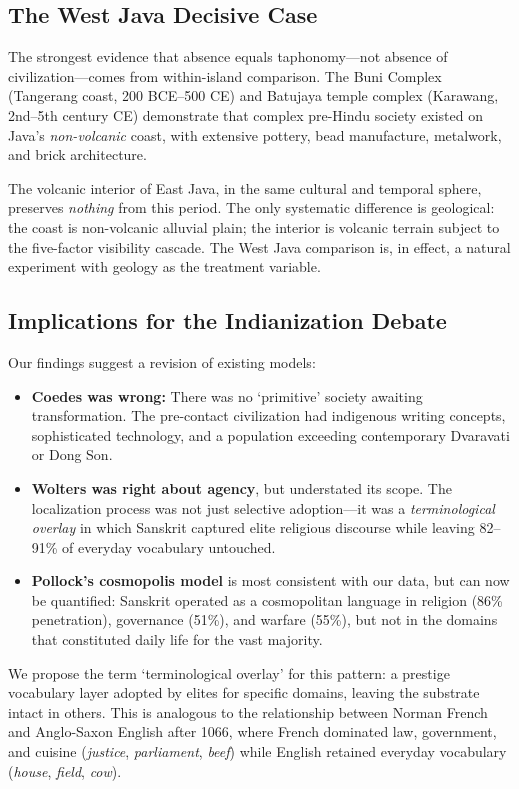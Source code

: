 \documentclass[12pt,a4paper]{article}
\begin{document}
\subsection{The West Java Decisive Case}

The strongest evidence that absence equals taphonomy---not absence of civilization---comes from within-island comparison. The Buni Complex (Tangerang coast, 200 BCE--500 CE) and Batujaya temple complex (Karawang, 2nd--5th century CE) demonstrate that complex pre-Hindu society existed on Java's \textit{non-volcanic} coast, with extensive pottery, bead manufacture, metalwork, and brick architecture.

The volcanic interior of East Java, in the same cultural and temporal sphere, preserves \textit{nothing} from this period. The only systematic difference is geological: the coast is non-volcanic alluvial plain; the interior is volcanic terrain subject to the five-factor visibility cascade. The West Java comparison is, in effect, a natural experiment with geology as the treatment variable.

\subsection{Implications for the Indianization Debate}

Our findings suggest a revision of existing models:

\begin{itemize}
\item \textbf{Coedes was wrong:} There was no `primitive' society awaiting transformation. The pre-contact civilization had indigenous writing concepts, sophisticated technology, and a population exceeding contemporary Dvaravati or Dong Son.
\item \textbf{Wolters was right about agency}, but understated its scope. The localization process was not just selective adoption---it was a \textit{terminological overlay} in which Sanskrit captured elite religious discourse while leaving 82--91\% of everyday vocabulary untouched.
\item \textbf{Pollock's cosmopolis model} is most consistent with our data, but can now be quantified: Sanskrit operated as a cosmopolitan language in religion (86\% penetration), governance (51\%), and warfare (55\%), but not in the domains that constituted daily life for the vast majority.
\end{itemize}

We propose the term `terminological overlay' for this pattern: a prestige vocabulary layer adopted by elites for specific domains, leaving the substrate intact in others. This is analogous to the relationship between Norman French and Anglo-Saxon English after 1066, where French dominated law, government, and cuisine (\textit{justice}, \textit{parliament}, \textit{beef}) while English retained everyday vocabulary (\textit{house}, \textit{field}, \textit{cow}).
\end{document}
